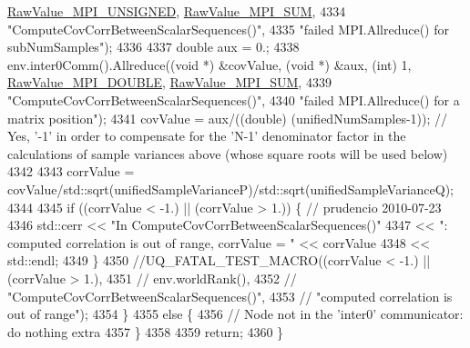 \begin{DoxyCode}
      \hyperlink{_mpi_comm_8h_a06cbfbc33436f6e0dc8a48ff3c49bdfc}{RawValue\_MPI\_UNSIGNED}, \hyperlink{_mpi_comm_8h_afbf78d291c032aa7f512bc566cee2bd1}{RawValue\_MPI\_SUM},
4334                                \textcolor{stringliteral}{"ComputeCovCorrBetweenScalarSequences()"},
4335                                \textcolor{stringliteral}{"failed MPI.Allreduce() for subNumSamples"});
4336 
4337     \textcolor{keywordtype}{double} aux = 0.;
4338     env.inter0Comm().Allreduce((\textcolor{keywordtype}{void} *) &covValue, (\textcolor{keywordtype}{void} *) &aux, (\textcolor{keywordtype}{int}) 1, 
      \hyperlink{_mpi_comm_8h_ad0f503bd9fecfe4e570ca3d15aaf2518}{RawValue\_MPI\_DOUBLE}, \hyperlink{_mpi_comm_8h_afbf78d291c032aa7f512bc566cee2bd1}{RawValue\_MPI\_SUM},
4339                                \textcolor{stringliteral}{"ComputeCovCorrBetweenScalarSequences()"},
4340                                \textcolor{stringliteral}{"failed MPI.Allreduce() for a matrix position"});
4341     covValue = aux/((double) (unifiedNumSamples-1)); \textcolor{comment}{// Yes, '-1' in order to compensate for the 'N-1'
       denominator factor in the calculations of sample variances above (whose square roots will be used below)}
4342 
4343     corrValue = covValue/std::sqrt(unifiedSampleVarianceP)/std::sqrt(unifiedSampleVarianceQ);
4344 
4345     \textcolor{keywordflow}{if} ((corrValue < -1.) || (corrValue > 1.)) \{ \textcolor{comment}{// prudencio 2010-07-23}
4346       std::cerr << \textcolor{stringliteral}{"In ComputeCovCorrBetweenScalarSequences()"}
4347                 << \textcolor{stringliteral}{": computed correlation is out of range, corrValue = "} << corrValue
4348                 << std::endl;
4349     \}
4350     \textcolor{comment}{//UQ\_FATAL\_TEST\_MACRO((corrValue < -1.) || (corrValue > 1.),}
4351     \textcolor{comment}{//                    env.worldRank(),}
4352     \textcolor{comment}{//                    "ComputeCovCorrBetweenScalarSequences()",}
4353     \textcolor{comment}{//                    "computed correlation is out of range");}
4354   \}
4355   \textcolor{keywordflow}{else} \{
4356     \textcolor{comment}{// Node not in the 'inter0' communicator: do nothing extra}
4357   \}
4358 
4359   \textcolor{keywordflow}{return};
4360 \}
\end{DoxyCode}
